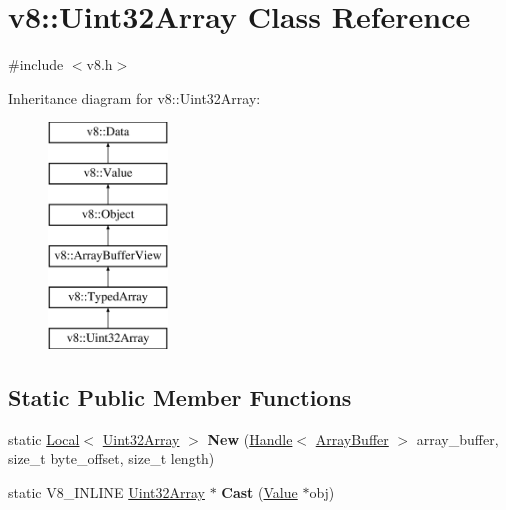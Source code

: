 \hypertarget{classv8_1_1_uint32_array}{}\section{v8\+:\+:Uint32\+Array Class Reference}
\label{classv8_1_1_uint32_array}


{\ttfamily \#include $<$v8.\+h$>$}

Inheritance diagram for v8\+:\+:Uint32\+Array\+:\begin{figure}[H]
\begin{center}
\leavevmode
\includegraphics[height=6.000000cm]{classv8_1_1_uint32_array}
\end{center}
\end{figure}
\subsection*{Static Public Member Functions}
\begin{DoxyCompactItemize}
\item 
\hypertarget{classv8_1_1_uint32_array_a38de3d179f9a569a91ee9aef4d9f923f}{}static \hyperlink{classv8_1_1_local}{Local}$<$ \hyperlink{classv8_1_1_uint32_array}{Uint32\+Array} $>$ {\bfseries New} (\hyperlink{classv8_1_1_handle}{Handle}$<$ \hyperlink{classv8_1_1_array_buffer}{Array\+Buffer} $>$ array\+\_\+buffer, size\+\_\+t byte\+\_\+offset, size\+\_\+t length)\label{classv8_1_1_uint32_array_a38de3d179f9a569a91ee9aef4d9f923f}

\item 
\hypertarget{classv8_1_1_uint32_array_ad40e645ee0abac443dba759ee861de49}{}static V8\+\_\+\+I\+N\+L\+I\+N\+E \hyperlink{classv8_1_1_uint32_array}{Uint32\+Array} $\ast$ {\bfseries Cast} (\hyperlink{classv8_1_1_value}{Value} $\ast$obj)\label{classv8_1_1_uint32_array_ad40e645ee0abac443dba759ee861de49}

\end{DoxyCompactItemize}
